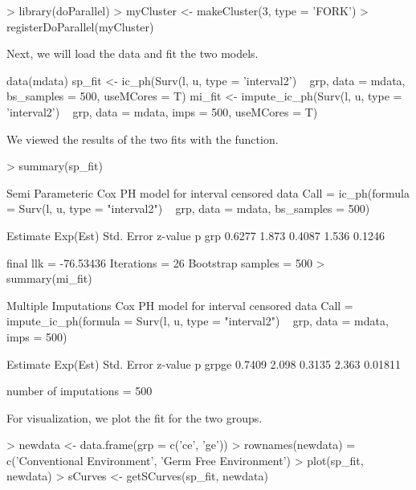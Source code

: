 \documentclass[article]{jss}
\begin{document}
{\begin{CodeChunk}
\begin{Code}
> library(doParallel)
> myCluster <- makeCluster(3, type = 'FORK')
> registerDoParallel(myCluster)
\end{Code}
\end{CodeChunk}	
	
	Next, we will load the data and fit the two models.
	
\begin{CodeChunk}
\begin{Code}
data(mdata)
sp_fit <- ic_ph(Surv(l, u, type = 'interval2') ~ grp, 
	data = mdata, bs_samples = 500, useMCores = T)
mi_fit <- impute_ic_ph(Surv(l, u, type = 'interval2') ~ grp, 
	data = mdata, imps = 500, useMCores = T)
\end{Code}
\end{CodeChunk}
	
	We viewed the results of the two fits with the  function. 

\begin{CodeChunk}
\begin{Code}
> summary(sp_fit)

Semi Parameteric Cox PH model for interval censored data
Call = 
ic_ph(formula = Surv(l, u, type = "interval2") ~ grp, data = mdata, 
    bs_samples = 500)

    Estimate Exp(Est) Std. Error z-value      p
grp   0.6277    1.873     0.4087   1.536 0.1246

final llk =  -76.53436 
Iterations =  26 
Bootstrap samples =  500 
> summary(mi_fit)

Multiple Imputations Cox PH model for interval censored data
Call = 
impute_ic_ph(formula = Surv(l, u, type = "interval2") ~ grp, 
    data = mdata, imps = 500)

      Estimate Exp(Est) Std. Error z-value       p
grpge   0.7409    2.098     0.3135   2.363 0.01811

number of imputations =  500 
\end{Code}
\end{CodeChunk}

	For visualization, we plot the  fit for the two groups. 
	
\begin{CodeChunk}
\begin{Code}
> newdata <- data.frame(grp = c('ce', 'ge'))
> rownames(newdata) = c('Conventional Environment', 'Germ Free Environment')
> plot(sp_fit, newdata)
> sCurves <- getSCurves(sp_fit, newdata)
\end{Code}
\end{CodeChunk}

}
\end{document}
